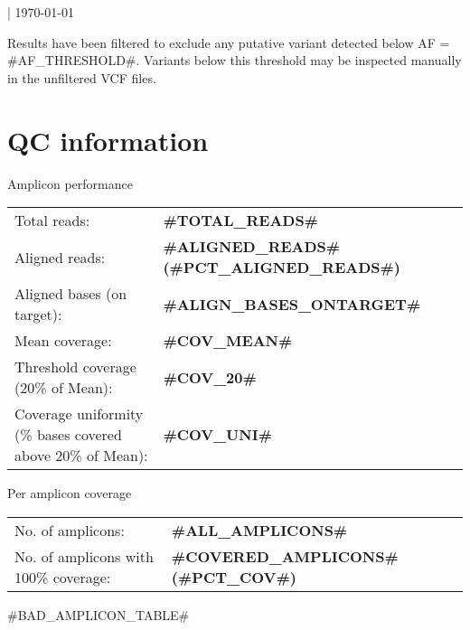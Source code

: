 \documentclass[11pt, a4paper, landscape]{article}
\newcommand{\lightfont}{\fontseries{l}\selectfont}
\newcommand{\mediumfont}{\fontseries{m}\selectfont}
\begin{document}
\noindent
{\fontsize{16pt}{16pt}\selectfont {}}

\medskip
\noindent
{\lightfont {#PANEL#} | \today}

\medskip
\noindent Results have been filtered to exclude any putative variant detected below AF = {{#AF_THRESHOLD#}}. Variants below this threshold may be inspected manually in the unfiltered VCF files.

\section{QC information}

\begin{multicols}{2}
\noindent
{\color{darkblue1} \fontsize{14pt}{14pt}\selectfont Amplicon performance}\\

\noindent
\lightfont
{}
\begin{tabularx}{\columnwidth}{X l}

Total reads: & \textbf{{#TOTAL_READS#}} \\
Aligned reads: & \textbf{{#ALIGNED_READS#}} \textbf{({#PCT_ALIGNED_READS#})} \\
Aligned bases (on target):& \textbf{{#ALIGN_BASES_ONTARGET#}} \\
Mean coverage:& \textbf{{#COV_MEAN#}} \\
Threshold coverage (20\% of Mean): & \textbf{{#COV_20#}} \\
Coverage uniformity (\% bases covered above 20\% of Mean): & \textbf{{#COV_UNI#}}  \\
\end{tabularx}

\columnbreak

\noindent
\mediumfont
{\color{darkblue1} \fontsize{14pt}{14pt}\selectfont  Per amplicon coverage}\\

\noindent
\lightfont
{}
\begin{tabularx}{\columnwidth}{X l}

No. of amplicons:& \textbf{{{#ALL_AMPLICONS#}}} \\
No. of amplicons with 100\% coverage:& \textbf{{#COVERED_AMPLICONS#} ({#PCT_COV#})} \\
\end{tabularx}
\end{multicols}


{#BAD_AMPLICON_TABLE#}
\end{document}
